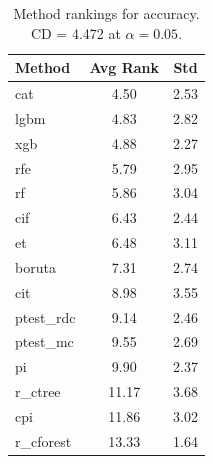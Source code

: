 \begin{table}[h]
\centering
\caption{Method rankings for accuracy. CD = 4.472 at $\alpha=0.05$.}
\label{tab:ranks_accuracy}
\begin{tabular}{lcc}
\toprule
Method & Avg Rank & Std \\
\midrule
cat & 4.50 & 2.53 \\
lgbm & 4.83 & 2.82 \\
xgb & 4.88 & 2.27 \\
rfe & 5.79 & 2.95 \\
rf & 5.86 & 3.04 \\
cif & 6.43 & 2.44 \\
et & 6.48 & 3.11 \\
boruta & 7.31 & 2.74 \\
cit & 8.98 & 3.55 \\
ptest_rdc & 9.14 & 2.46 \\
ptest_mc & 9.55 & 2.69 \\
pi & 9.90 & 2.37 \\
r_ctree & 11.17 & 3.68 \\
cpi & 11.86 & 3.02 \\
r_cforest & 13.33 & 1.64 \\
\bottomrule
\end{tabular}
\end{table}